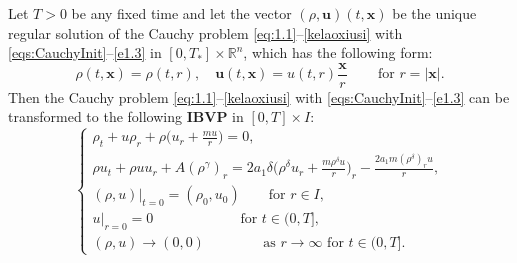 \documentclass[11pt,reqno]{amsart}
\numberwithin{rk}{section}
\numberwithin{prop}{section}
\numberwithin{mydef}{section}
\numberwithin{lem}{section}
\numberwithin{equation}{section}
\numberwithin{thm}{section}
\begin{document}
Let $T>0$ be any fixed time and let the vector $(\rho,\boldsymbol{u})(t,\boldsymbol{x})$ be the unique regular solution of the Cauchy problem \eqref{eq:1.1}--\eqref{kelaoxiusi} with  \eqref{eqs:CauchyInit}--\eqref{e1.3} in $[0,T_*]\times\mathbb{R}^n$, which has the following form:
\begin{equation}\label{e1.4}
\rho(t,\boldsymbol{x})=\rho(t,r), \quad \boldsymbol{u}(t,\boldsymbol{x})=u(t,r)\frac{\boldsymbol{x}}{r}\qquad \, \text{for $r=|\boldsymbol{x}|$}.
\end{equation}
Then the Cauchy problem \eqref{eq:1.1}--\eqref{kelaoxiusi} with  \eqref{eqs:CauchyInit}--\eqref{e1.3} can be transformed to the following \textbf{IBVP} in $[0,T]\times I$:
\begin{equation}\label{e1.5}
\begin{cases}
\displaystyle 
\rho_t+u\rho_r+\rho\big(u_r+\frac{m u}{r}\big)=0,\\[3pt]
\displaystyle
\rho u_t+\rho uu_r+A(\rho^\gamma)_r=2a_1\delta\big(\rho^\delta u_r+\frac{m\rho^\delta u}{r} \big)_r-\frac{2a_1 m(\rho^\delta)_r u}{r},\\[3pt]
\displaystyle
(\rho, u)|_{t=0}=(\rho_0, u_0 )\qquad\text{for  $r\in I$},\\[3pt]
\displaystyle
u|_{r=0}=0\qquad\qquad\qquad \ \text{for $t\in(0,T]$},\\[3pt]
\displaystyle
(\rho,u)\to \left(0,0\right) \qquad\qquad \, \text{as $r\to \infty$ \ for $t\in (0,T]$}.
\end{cases}
\end{equation}
\end{document}
